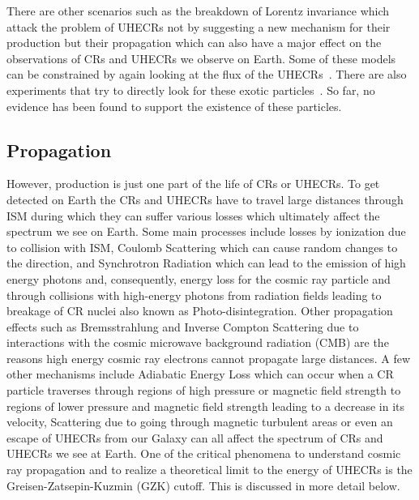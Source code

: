 There are other scenarios such as the breakdown of Lorentz invariance which attack the problem of UHECRs not by suggesting a new mechanism for their production but their propagation which can also have a major effect on the observations of CRs and UHECRs we observe on Earth. Some of these models can be constrained by again looking at the flux of the UHECRs~\cite{PierreAuger:2021tog}. There are also experiments that try to directly look for these exotic particles~\cite{XENON:2023cxc,LZ:2022lsv}. So far, no evidence has been found to support the existence of these particles. 

\subsection{Propagation}
\label{subsec:crprop}
However, production is just one part of the life of CRs or UHECRs. To get detected on Earth the CRs and UHECRs have to travel large distances through ISM during which they can suffer various losses which ultimately affect the spectrum we see on Earth. Some main processes include losses by ionization due to collision with ISM, Coulomb Scattering which can cause random changes to the direction, and Synchrotron Radiation which can lead to the emission of high energy photons and, consequently, energy loss for the cosmic ray particle and through collisions with high-energy photons from radiation fields leading to breakage of CR nuclei also known as Photo-disintegration. Other propagation effects such as Bremsstrahlung and Inverse Compton Scattering due to interactions with the cosmic microwave background radiation (CMB) are the reasons high energy cosmic ray electrons cannot propagate large distances. A few other mechanisms include Adiabatic Energy Loss which can occur when a CR particle traverses through regions of high pressure or magnetic field strength to regions of lower pressure and magnetic field strength leading to a decrease in its velocity, Scattering due to going through magnetic turbulent areas or even an escape of UHECRs from our Galaxy can all affect the spectrum of CRs and UHECRs we see at Earth. One of the critical phenomena to understand cosmic ray propagation and to realize a theoretical limit to the energy of UHECRs is the Greisen-Zatsepin-Kuzmin (GZK) cutoff. This is discussed in more detail below.


